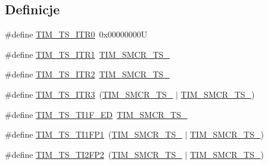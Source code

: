 \subsection*{Definicje}
\begin{DoxyCompactItemize}
\item 
\#define \hyperlink{group___t_i_m___trigger___selection_gab7cf2b7db3956d4fd1e5a5d84f4891e7}{T\+I\+M\+\_\+\+T\+S\+\_\+\+I\+T\+R0}~0x00000000U
\item 
\#define \hyperlink{group___t_i_m___trigger___selection_gad90fbca297153ca9c0112a67ea2c6cb3}{T\+I\+M\+\_\+\+T\+S\+\_\+\+I\+T\+R1}~\hyperlink{group___peripheral___registers___bits___definition_ga8d1f040f9259acb3c2fba7b0c7eb3d96}{T\+I\+M\+\_\+\+S\+M\+C\+R\+\_\+\+T\+S\+\_}
\item 
\#define \hyperlink{group___t_i_m___trigger___selection_ga8599ba58a5f911d648503c7ac55d4320}{T\+I\+M\+\_\+\+T\+S\+\_\+\+I\+T\+R2}~\hyperlink{group___peripheral___registers___bits___definition_gacb82212fcc89166a43ff97542da9182d}{T\+I\+M\+\_\+\+S\+M\+C\+R\+\_\+\+T\+S\+\_}
\item 
\#define \hyperlink{group___t_i_m___trigger___selection_ga63183e611b91c5847040172c0069514d}{T\+I\+M\+\_\+\+T\+S\+\_\+\+I\+T\+R3}~(\hyperlink{group___peripheral___registers___bits___definition_ga8d1f040f9259acb3c2fba7b0c7eb3d96}{T\+I\+M\+\_\+\+S\+M\+C\+R\+\_\+\+T\+S\+\_} $\vert$ \hyperlink{group___peripheral___registers___bits___definition_gacb82212fcc89166a43ff97542da9182d}{T\+I\+M\+\_\+\+S\+M\+C\+R\+\_\+\+T\+S\+\_})
\item 
\#define \hyperlink{group___t_i_m___trigger___selection_ga8c89554efc693e679c94b5a749af123c}{T\+I\+M\+\_\+\+T\+S\+\_\+\+T\+I1\+F\+\_\+\+ED}~\hyperlink{group___peripheral___registers___bits___definition_gacf0dbaf4a2ec8759f283f82a958ef6a8}{T\+I\+M\+\_\+\+S\+M\+C\+R\+\_\+\+T\+S\+\_}
\item 
\#define \hyperlink{group___t_i_m___trigger___selection_ga38d3514d54bcdb0ea8ac8bd91c5832b5}{T\+I\+M\+\_\+\+T\+S\+\_\+\+T\+I1\+F\+P1}~(\hyperlink{group___peripheral___registers___bits___definition_ga8d1f040f9259acb3c2fba7b0c7eb3d96}{T\+I\+M\+\_\+\+S\+M\+C\+R\+\_\+\+T\+S\+\_} $\vert$ \hyperlink{group___peripheral___registers___bits___definition_gacf0dbaf4a2ec8759f283f82a958ef6a8}{T\+I\+M\+\_\+\+S\+M\+C\+R\+\_\+\+T\+S\+\_})
\item 
\#define \hyperlink{group___t_i_m___trigger___selection_ga0ed58a269bccd3f22d19cc9a2ba3123f}{T\+I\+M\+\_\+\+T\+S\+\_\+\+T\+I2\+F\+P2}~(\hyperlink{group___peripheral___registers___bits___definition_gacb82212fcc89166a43ff97542da9182d}{T\+I\+M\+\_\+\+S\+M\+C\+R\+\_\+\+T\+S\+\_} $\vert$ \hyperlink{group___peripheral___registers___bits___definition_gacf0dbaf4a2ec8759f283f82a958ef6a8}{T\+I\+M\+\_\+\+S\+M\+C\+R\+\_\+\+T\+S\+\_})

\end{DoxyCompactItemize}
